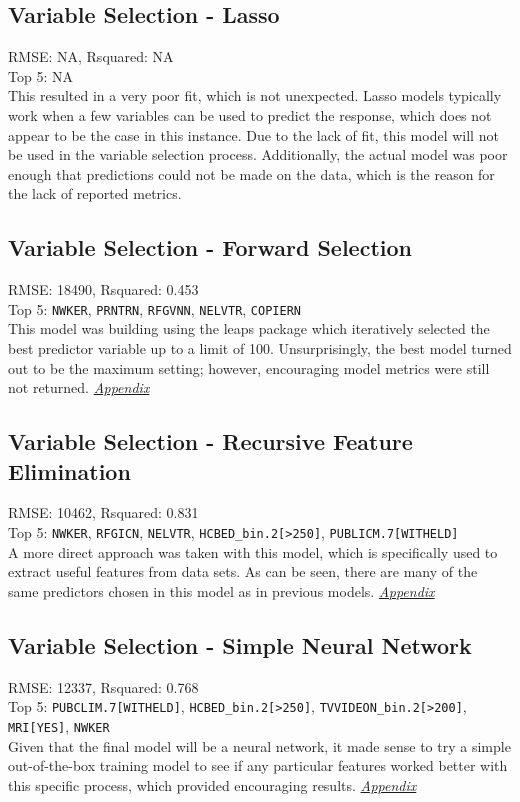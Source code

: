 \subsection{Variable Selection - Lasso}
RMSE: NA, Rsquared: NA\\
 Top 5: NA
\\[0.1in]
\indent This resulted in a very poor fit, which is not unexpected.  Lasso models typically work when a few variables can be used to predict the response, which does not appear to be the case in this instance.  Due to the lack of fit, this model will not be used in the variable selection process.  Additionally, the actual model was poor enough that predictions could not be made on the data, which is the reason for the lack of reported metrics.

\subsection{Variable Selection - Forward Selection}
RMSE: 18490, Rsquared: 0.453\\
Top 5: \lstinline{NWKER}, \lstinline{PRNTRN}, \lstinline{RFGVNN}, \lstinline{NELVTR}, \lstinline{COPIERN}
\\[0.1in]
\indent This model was building using the leaps package which iteratively selected the best predictor variable up to a limit of 100.  Unsurprisingly, the best model turned out to be the maximum setting; however, encouraging model metrics were still not returned.  \textit{\hyperref[appendix:electricity:lp]{Appendix}}

\subsection{Variable Selection - Recursive Feature Elimination}
RMSE: 10462, Rsquared: 0.831\\
Top 5: \lstinline{NWKER}, \lstinline{RFGICN}, \lstinline{NELVTR}, \lstinline{HCBED_bin.2[>250]}, \lstinline{PUBLICM.7[WITHELD]}
\\[0.1in]
\indent A more direct approach was taken with this model, which is specifically used to extract useful features from data sets.  As can be seen, there are many of the same predictors chosen in this model as in previous models.  \textit{\hyperref[appendix:electricity:rfe]{Appendix}}

\subsection{Variable Selection - Simple Neural Network}
RMSE: 12337, Rsquared: 0.768\\
Top 5: \lstinline{PUBCLIM.7[WITHELD]}, \lstinline{HCBED_bin.2[>250]}, \lstinline{TVVIDEON_bin.2[>200]}, \lstinline{MRI[YES]}, \lstinline{NWKER}
\\[0.1in]
\indent Given that the final model will be a neural network, it made sense to try a simple out-of-the-box training model to see if any particular features worked better with this specific process, which provided encouraging results. \textit{\hyperref[appendix:electricity:snn]{Appendix}}
\newpage

